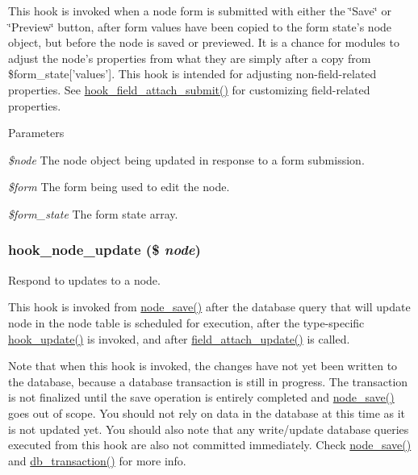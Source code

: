 This hook is invoked when a node form is submitted with either the \char`\"{}Save\char`\"{} or \char`\"{}Preview\char`\"{} button, after form values have been copied to the form state's node object, but before the node is saved or previewed. It is a chance for modules to adjust the node's properties from what they are simply after a copy from \$form\_\-state\mbox{[}'values'\mbox{]}. This hook is intended for adjusting non-\/field-\/related properties. See \hyperlink{group__field__attach_ga368ea58ca800b1e1f69f4b88e82f9ae0}{hook\_\-field\_\-attach\_\-submit()} for customizing field-\/related properties.


\begin{DoxyParams}{Parameters}
\item[{\em \$node}]The node object being updated in response to a form submission. \item[{\em \$form}]The form being used to edit the node. \item[{\em \$form\_\-state}]The form state array. \end{DoxyParams}
\hypertarget{group__node__api__hooks_gac66c767cc922fcbfdaf17252e5d87d9d}{
\subsubsection[{hook\_\-node\_\-update}]{\setlength{\rightskip}{0pt plus 5cm}hook\_\-node\_\-update (\$ {\em node})}}
\label{group__node__api__hooks_gac66c767cc922fcbfdaf17252e5d87d9d}
Respond to updates to a node.

This hook is invoked from \hyperlink{node_8module_a26add7591be64b30a18232927ef14faf}{node\_\-save()} after the database query that will update node in the node table is scheduled for execution, after the type-\/specific \hyperlink{group__node__api__hooks_gaf9c98e3839e9405df42b50c8cdfa9dca}{hook\_\-update()} is invoked, and after \hyperlink{group__field__attach_ga8d15efdca36306ea04552bed4986e77b}{field\_\-attach\_\-update()} is called.

Note that when this hook is invoked, the changes have not yet been written to the database, because a database transaction is still in progress. The transaction is not finalized until the save operation is entirely completed and \hyperlink{node_8module_a26add7591be64b30a18232927ef14faf}{node\_\-save()} goes out of scope. You should not rely on data in the database at this time as it is not updated yet. You should also note that any write/update database queries executed from this hook are also not committed immediately. Check \hyperlink{node_8module_a26add7591be64b30a18232927ef14faf}{node\_\-save()} and \hyperlink{group__database_gabdd0e69f5b2c63f8ad9e76f0fdf552be}{db\_\-transaction()} for more info.


